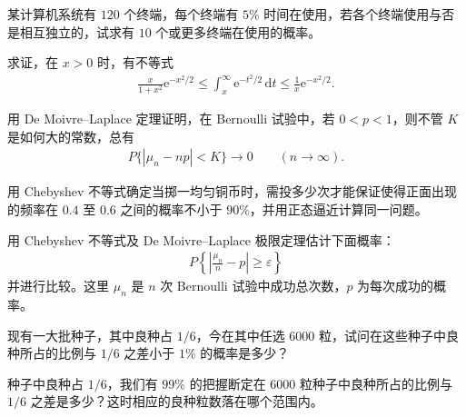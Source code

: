 \documentclass[../../main.tex]{subfiles}
\begin{document}
\begin{exercise}\label{exercise:ch05-12}
某计算机系统有 $120$ 个终端，每个终端有 $5\%$ 时间在使用，若各个终端使用与否是相互独立的，试求有 $10$ 个或更多终端在使用的概率。
\end{exercise}

\begin{exercise}\label{exercise:ch05-13}
求证，在 $x>0$ 时，有不等式
\begin{align*}
\frac{x}{1+x^{2}}\mathrm{e}^{-x^{2}/2}\leqslant\int_{x}^{\infty}\mathrm{e}^{-t^{2}/2}\,\mathrm{d}t\leqslant\frac1x\mathrm{e}^{-x^{2}/2}.
\end{align*}
\end{exercise}

\begin{exercise}\label{exercise:ch05-14}
用 De Moivre--Laplace 定理证明，在 Bernoulli 试验中，若 $0<p<1$，则不管 $K$ 是如何大的常数，总有
\begin{align*}
P\{|\mu_n-np|<K\}\to0\qquad(n\to\infty).
\end{align*}
\end{exercise}

\begin{exercise}\label{exercise:ch05-15}
用 Chebyshev 不等式确定当掷一均匀铜币时，需投多少次才能保证使得正面出现的频率在 $0.4$ 至 $0.6$ 之间的概率不小于 $90\%$，并用正态逼近计算同一问题。
\end{exercise}

\begin{exercise}\label{exercise:ch05-16}
用 Chebyshev 不等式及 De Moivre--Laplace 极限定理估计下面概率：
\begin{align*}
P\!\left\{\left|\frac{\mu_n}{n}-p\right|\geqslant\varepsilon\right\}
\end{align*}
并进行比较。这里 $\mu_n$ 是 $n$ 次 Bernoulli 试验中成功总次数，$p$ 为每次成功的概率。
\end{exercise}

\begin{exercise}\label{exercise:ch05-17}
现有一大批种子，其中良种占 $1/6$，今在其中任选 $6000$ 粒，试问在这些种子中良种所占的比例与 $1/6$ 之差小于 $1\%$ 的概率是多少？
\end{exercise}

\begin{exercise}\label{exercise:ch05-18}
种子中良种占 $1/6$，我们有 $99\%$ 的把握断定在 $6000$ 粒种子中良种所占的比例与 $1/6$ 之差是多少？这时相应的良种粒数落在哪个范围内。
\end{exercise}
\end{document}
